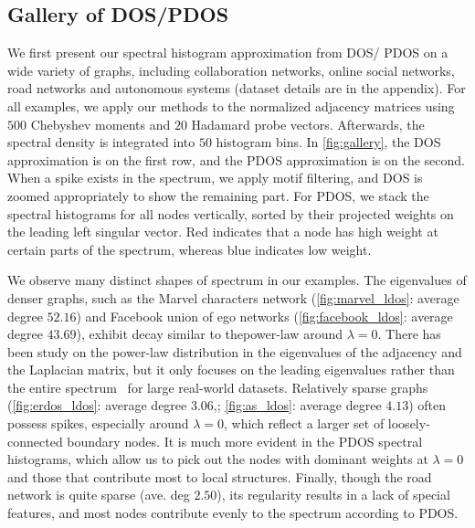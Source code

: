 \subsection{Gallery of DOS/PDOS}
We first present our spectral histogram approximation from DOS/ PDOS on a wide
variety of graphs, including collaboration networks, online social networks,
road networks and autonomous systems (dataset details are in the appendix). For
all examples, we apply our methods to the normalized adjacency matrices using
$500$ Chebyshev moments and $20$ Hadamard probe vectors. Afterwards, the
spectral density is integrated into $50$ histogram bins. In \cref{fig:gallery},
the DOS approximation is on the first row, and the PDOS approximation is on the
second. When a spike exists in the spectrum, we apply motif filtering, and DOS
is zoomed appropriately to show the remaining part. For PDOS, we stack the
spectral histograms for all nodes vertically, sorted by their projected weights
on the leading left singular vector. Red indicates that a node has high weight
at certain parts of the spectrum, whereas blue indicates low weight.

We observe many distinct shapes of spectrum in our examples. The eigenvalues of
denser graphs, such as the Marvel characters network (\ref{fig:marvel_ldos}:
average degree $52.16$) and Facebook union of ego networks 
(\ref{fig:facebook_ldos}: average degree $43.69$), exhibit decay similar to
thepower-law around $\lambda=0$. There has been study on the power-law
distribution in the eigenvalues of the adjacency and the Laplacian matrix, but
it only focuses on the leading eigenvalues rather than the entire spectrum~
\cite{eikmeier2017revisiting} for large real-world datasets. Relatively sparse
graphs (\ref{fig:erdos_ldos}: average degree $3.06$,; \ref{fig:as_ldos}: average
degree $4.13$) often possess spikes, especially around $\lambda=0$, which
reflect a larger set of loosely-connected boundary nodes. It is much more
evident in the PDOS spectral histograms, which allow us to pick out the nodes
with dominant weights at $\lambda=0$ and those that contribute most to local
structures. Finally, though the road network is quite sparse (ave. deg $2.50$),
its regularity results in a lack of special features, and most nodes contribute
evenly to the spectrum according to PDOS.

